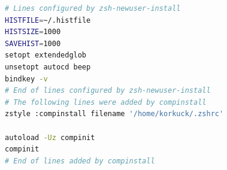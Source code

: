\documentclass{article}
\begin{document}
\begin{lstlisting}[language=bash]
# Lines configured by zsh-newuser-install
HISTFILE=~/.histfile
HISTSIZE=1000
SAVEHIST=1000
setopt extendedglob
unsetopt autocd beep
bindkey -v
# End of lines configured by zsh-newuser-install
# The following lines were added by compinstall
zstyle :compinstall filename '/home/korkuck/.zshrc'

autoload -Uz compinit
compinit
# End of lines added by compinstall
\end{lstlisting}
\end{document}
